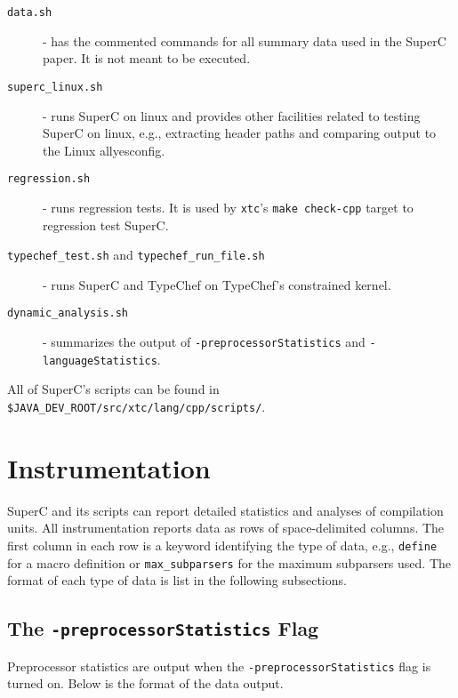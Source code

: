 \documentclass{article}
\newcommand{\SuperC}{{\textsf{Su\-perC}}}
\begin{document}
\begin{description}
\item[\texttt{data.sh}] - has the commented commands for all summary
  data used in the \SuperC{} paper.  It is not meant to be executed.

\item[\texttt{superc\_linux.sh}] - runs \SuperC{} on linux and
  provides other facilities related to testing \SuperC{} on linux,
  e.g., extracting header paths and comparing output to the Linux
  allyesconfig.

\item[\texttt{regression.sh}] - runs regression tests.  It is used by
  \verb"xtc"'s \verb"make check-cpp" target to regression test
  \SuperC{}.

\item[\texttt{typechef\_test.sh} and \texttt{typechef\_run\_file.sh}]
  - runs \SuperC{} and TypeChef on TypeChef's constrained kernel.

\item[\texttt{dynamic\_analysis.sh}] - summarizes the output of
  \texttt{-preprocessorStatistics} and \texttt{-languageStatistics}.


\end{description}

All of \SuperC{}'s scripts can be found in
\verb"$JAVA_DEV_ROOT/src/xtc/lang/cpp/scripts/".


\section{Instrumentation}

\SuperC{} and its scripts can report detailed statistics and analyses
of compilation units.  All instrumentation reports data as rows of
space-delimited columns.  The first column in each row is a keyword
identifying the type of data, e.g., \verb"define" for a macro
definition or \verb"max_subparsers" for the maximum subparsers used.
The format of each type of data is list in the following subsections.

\subsection{The \texttt{-preprocessorStatistics} Flag}

Preprocessor statistics are output when the \verb"-preprocessorStatistics"
flag is turned on.  Below is the format of the data output.
\end{document}

